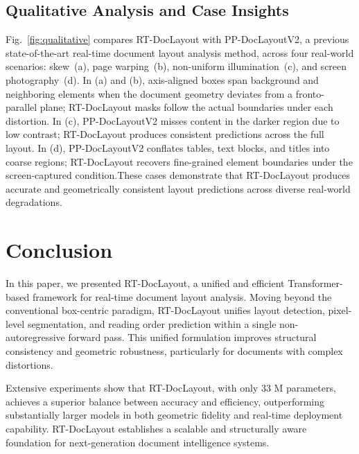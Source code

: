 \documentclass[11pt, a4paper,logo,  copyright, nonumbering]{paddleocr}
\begin{document}
\subsection{Qualitative Analysis and Case Insights}
\label{subsec:qualitative_analysis_and_case_insights}

Fig.~\ref{fig:qualitative} compares RT-DocLayout with PP-DocLayoutV2, a previous state-of-the-art real-time document layout analysis method, across four real-world scenarios: skew~(a), page warping~(b), non-uniform illumination~(c), and screen photography~(d). In (a) and (b), axis-aligned boxes span background and neighboring elements when the document geometry deviates from a fronto-parallel plane; RT-DocLayout masks follow the actual boundaries under each distortion. In (c), PP-DocLayoutV2 misses content in the darker region due to low contrast; RT-DocLayout produces consistent predictions across the full layout. In (d), PP-DocLayoutV2 conflates tables, text blocks, and titles into coarse regions; RT-DocLayout recovers fine-grained element boundaries under the screen-captured condition.These cases demonstrate that RT-DocLayout produces accurate and geometrically consistent layout predictions across diverse real-world degradations.

\section{Conclusion}
\label{sec:conclusion}

In this paper, we presented RT-DocLayout, a unified and efficient Transformer-based framework for real-time document layout analysis. Moving beyond the conventional box-centric paradigm, RT-DocLayout unifies layout detection, pixel-level segmentation, and reading order prediction within a single non-autoregressive forward pass. This unified formulation improves structural consistency and geometric robustness, particularly for documents with complex distortions.

Extensive experiments show that RT-DocLayout, with only 33 M parameters, achieves a superior balance between accuracy and efficiency, outperforming substantially larger models in both geometric fidelity and real-time deployment capability. RT-DocLayout establishes a scalable and structurally aware foundation for next-generation document intelligence systems.

% 




\setcounter{figure}{0}
\makeatletter 
\renewcommand{\thefigure}{A\@arabic\c@figure}
\makeatother

\setcounter{table}{0}
\makeatletter 
\renewcommand{\thetable}{A\@arabic\c@table}
\makeatother


\clearpage 
\newpage
\end{document}
